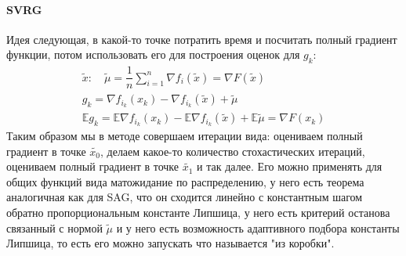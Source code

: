 \paragraph{SVRG}
Идея следующая, в какой-то точке потратить время и посчитать полный градиент функции, потом использовать его для построения оценок для $g_k$:
\begin{gather*}
    \tilde{x}: \quad \tilde{\mu} = \dfrac{1}{n} \sum\limits_{i=1}^{n} \nabla f_i (\tilde{x}) = \nabla F(\tilde{x}) \\
    g_k = \nabla f_{i_k} (x_k) - \nabla f_{i_k} (\tilde{x}) + \tilde{\mu} \\
    \mathbb{E} g_k = \mathbb{E} \nabla f_{i_k} (x_k) - \mathbb{E} \nabla f_{i_k} (\tilde{x}) + \mathbb{E} \tilde{\mu} = \nabla F(x_k)
\end{gather*}
Таким образом мы в методе совершаем итерации вида: оцениваем полный градиент в точке $\tilde{x_0}$, делаем какое-то количество стохастических итераций, оцениваем полный градиент в точке $\tilde{x_1}$ и так далее. Его можно применять для общих функций вида матожидание по распределению, у него есть теорема аналогичная как для SAG, что он сходится линейно с константным шагом обратно пропорциональным константе Липшица, у него есть критерий останова связанный с нормой $\tilde{\mu}$ и у него есть возможность адаптивного подбора константы Липшица, то есть его можно запускать что называется "из коробки".